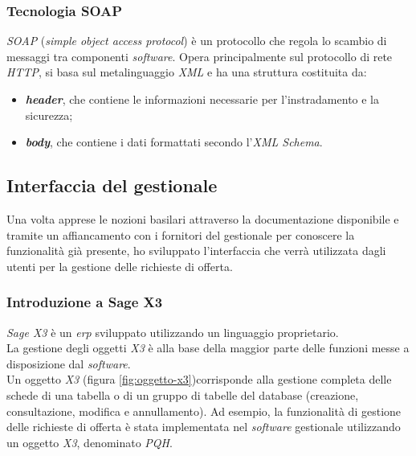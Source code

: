 \subsubsection{Tecnologia SOAP}
\textit{SOAP} (\textit{simple object access protocol}) è un protocollo che regola lo scambio di messaggi tra componenti \textit{software}. Opera principalmente sul protocollo di rete \textit{HTTP}, si basa sul metalinguaggio \textit{XML} e ha una struttura costituita da:
\begin{itemize}
	\item \textit{\textbf{header}}, che contiene le informazioni necessarie per l'instradamento e la sicurezza; 
	\item \textit{\textbf{body}}, che contiene i dati formattati secondo l'\textit{XML Schema}.
\end{itemize}



\vspace{15pt}

\subsection{Interfaccia del gestionale}
\label{cap:architettura-sage}
Una volta apprese le nozioni basilari attraverso la documentazione disponibile e tramite un affiancamento con i fornitori del gestionale per conoscere la funzionalità già
presente, ho sviluppato l'interfaccia che verrà utilizzata dagli utenti per la gestione delle richieste di offerta.

\subsubsection{Introduzione a Sage X3}
\textit{Sage X3} è un \textit{\gls{erp}\glsfirstoccur} sviluppato utilizzando un linguaggio proprietario.\\
La gestione degli oggetti\textit{ X3} è alla base della maggior parte delle funzioni messe a disposizione dal \textit{software}.\\
Un oggetto\textit{ X3} (figura \ref{fig:oggetto-x3})corrisponde alla gestione completa delle schede di una tabella o di un gruppo di tabelle del database (creazione, consultazione, modifica e annullamento).
Ad esempio, la funzionalità di gestione delle richieste di offerta è stata implementata nel \textit{software} gestionale utilizzando un oggetto\textit{ X3}, denominato \textit{PQH}.

